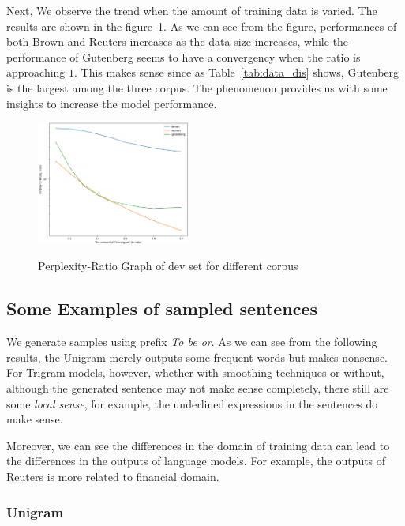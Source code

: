 Next, We observe the trend when the amount of training data is varied. The results are shown in the figure~\ref{fig:ratio}. As we can see from the figure, performances of both Brown and Reuters increases as the data size increases, while the performance of Gutenberg seems to have a convergency when the ratio is approaching $1$. This makes sense since as Table~\ref{tab:data_dis} shows, Gutenberg is the largest among the three corpus. The phenomenon provides us with some insights to increase the model performance.

\begin{figure}[h]
\caption{Perplexity-Ratio Graph of dev set for different corpus}
\centering
\includegraphics[width=0.45\textwidth]{files/figs/Perplexity-Ratio.png}
\label{fig:ratio}
\end{figure}



\subsection{\textbf{Some Examples of sampled sentences}}

We generate samples using prefix \textit{To be or}. As we can see from the following results, the Unigram merely outputs some frequent words but makes nonsense. For Trigram models, however, whether with smoothing techniques or without, although the generated sentence may not make sense completely, there still are some \textit{local sense}, for example, the underlined expressions in the sentences do make sense.

Moreover, we can see the differences in the domain of training data can lead to the differences in the outputs of language models. For example, the outputs of Reuters is more related to financial domain.

\subsubsection{\textbf{Unigram}}

